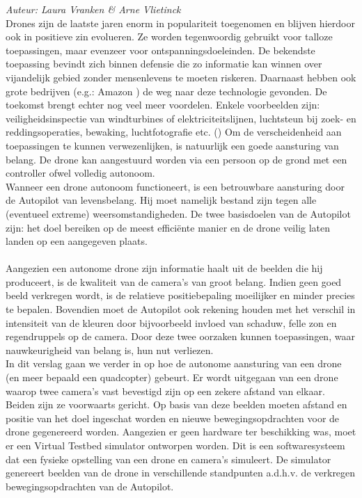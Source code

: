 {\em Auteur: Laura Vranken \& Arne Vlietinck}\\

\noindent
Drones zijn de laatste jaren enorm in populariteit toegenomen en blijven hierdoor ook in positieve zin evolueren. Ze worden tegenwoordig gebruikt voor talloze toepassingen, maar evenzeer voor ontspanningsdoeleinden. De bekendste toepassing bevindt zich binnen defensie die zo informatie kan winnen over vijandelijk gebied zonder mensenlevens te moeten riskeren. Daarnaast hebben ook grote bedrijven (e.g.: Amazon \cite{website:Amazon}) de weg naar deze technologie gevonden. De toekomst brengt echter nog veel meer voordelen. Enkele voorbeelden zijn: veiligheidsinspectie van windturbines of elektriciteitslijnen, luchtsteun bij zoek- en reddingsoperaties, bewaking, luchtfotografie etc. (\cite{website:microdrones}) Om de verscheidenheid aan toepassingen te kunnen verwezenlijken, is natuurlijk een goede aansturing van belang. De drone kan aangestuurd worden via een persoon op de grond met een controller ofwel volledig autonoom. 
\\
Wanneer een drone autonoom functioneert, is een betrouwbare aansturing door de Autopilot van levensbelang. Hij moet namelijk bestand zijn tegen alle (eventueel extreme) weersomstandigheden. De twee basisdoelen van de Autopilot zijn: het doel bereiken op de meest efficiënte manier en de drone veilig laten landen op een aangegeven plaats.
\\
\\
Aangezien een autonome drone zijn informatie haalt uit de beelden die hij produceert, is de kwaliteit van de camera's van groot belang. Indien geen goed beeld verkregen wordt, is de relatieve positiebepaling moeilijker en minder precies te bepalen. Bovendien moet de Autopilot ook rekening houden met het verschil in intensiteit van de kleuren door bijvoorbeeld invloed van schaduw, felle zon en regendruppels op de camera. Door deze twee oorzaken kunnen toepassingen, waar nauwkeurigheid van belang is, hun nut verliezen. 
\\
In dit verslag gaan we verder in op hoe de autonome aansturing van een drone (en meer bepaald een quadcopter) gebeurt. Er wordt uitgegaan van een drone waarop twee camera's vast bevestigd zijn op een zekere afstand van elkaar. Beiden zijn ze voorwaarts gericht. Op basis van deze beelden moeten afstand en positie van het doel ingeschat worden en nieuwe bewegingsopdrachten voor de drone gegenereerd worden. Aangezien er geen hardware ter beschikking was, moet er een Virtual Testbed simulator ontworpen worden. Dit is een softwaresysteem dat een fysieke opstelling van een drone en camera's simuleert. \cite{arcticle:opgavePeno} De simulator genereert beelden van de drone in verschillende standpunten a.d.h.v. de verkregen bewegingsopdrachten van de Autopilot. 

